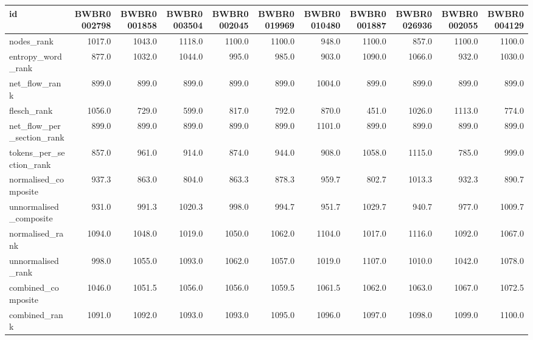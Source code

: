 \begin{tabular}{lrrrrrrrrrr}
\toprule
id & BWBR0002798 & BWBR0001858 & BWBR0003504 & BWBR0002045 & BWBR0019969 & BWBR0010480 & BWBR0001887 & BWBR0026936 & BWBR0002055 & BWBR0004129 \\
\midrule
nodes\_rank & 1017.0 & 1043.0 & 1118.0 & 1100.0 & 1100.0 & 948.0 & 1100.0 & 857.0 & 1100.0 & 1100.0 \\
\cline{1-11}
entropy\_word\_rank & 877.0 & 1032.0 & 1044.0 & 995.0 & 985.0 & 903.0 & 1090.0 & 1066.0 & 932.0 & 1030.0 \\
\cline{1-11}
net\_flow\_rank & 899.0 & 899.0 & 899.0 & 899.0 & 899.0 & 1004.0 & 899.0 & 899.0 & 899.0 & 899.0 \\
\cline{1-11}
flesch\_rank & 1056.0 & 729.0 & 599.0 & 817.0 & 792.0 & 870.0 & 451.0 & 1026.0 & 1113.0 & 774.0 \\
\cline{1-11}
net\_flow\_per\_section\_rank & 899.0 & 899.0 & 899.0 & 899.0 & 899.0 & 1101.0 & 899.0 & 899.0 & 899.0 & 899.0 \\
\cline{1-11}
tokens\_per\_section\_rank & 857.0 & 961.0 & 914.0 & 874.0 & 944.0 & 908.0 & 1058.0 & 1115.0 & 785.0 & 999.0 \\
\cline{1-11}
normalised\_composite & 937.3 & 863.0 & 804.0 & 863.3 & 878.3 & 959.7 & 802.7 & 1013.3 & 932.3 & 890.7 \\
\cline{1-11}
unnormalised\_composite & 931.0 & 991.3 & 1020.3 & 998.0 & 994.7 & 951.7 & 1029.7 & 940.7 & 977.0 & 1009.7 \\
\cline{1-11}
normalised\_rank & 1094.0 & 1048.0 & 1019.0 & 1050.0 & 1062.0 & 1104.0 & 1017.0 & 1116.0 & 1092.0 & 1067.0 \\
\cline{1-11}
unnormalised\_rank & 998.0 & 1055.0 & 1093.0 & 1062.0 & 1057.0 & 1019.0 & 1107.0 & 1010.0 & 1042.0 & 1078.0 \\
\cline{1-11}
combined\_composite & 1046.0 & 1051.5 & 1056.0 & 1056.0 & 1059.5 & 1061.5 & 1062.0 & 1063.0 & 1067.0 & 1072.5 \\
\cline{1-11}
combined\_rank & 1091.0 & 1092.0 & 1093.0 & 1093.0 & 1095.0 & 1096.0 & 1097.0 & 1098.0 & 1099.0 & 1100.0 \\
\cline{1-11}
\bottomrule
\end{tabular}
